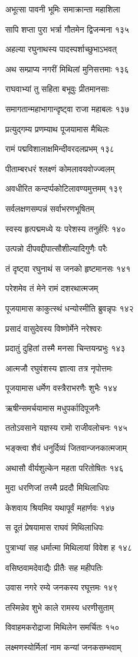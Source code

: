 अभूत्सा पावनी भूमिः समाक्रान्ता महाशिला

सापि शप्ता पुरा भर्त्रा गौतमेन द्विजन्मना १३५

अहल्या रघुनाथस्य पादस्पर्शाच्छुभाऽभवत्

अथ सम्प्राप्य नगरीं मिथिलां मुनिसत्तमाः १३६

राघवाभ्यां तु सहिता बभूवुः प्रीतमानसाः

समागतान्महाभागान्दृष्ट्वा राजा महाबलः १३७

प्रत्युद्गम्य प्रणम्याथ पूजयामास मैथिलः

रामं पद्मविशालाक्षमिन्दीवरदलप्रभम् १३८

पीताम्बरधरं श्लक्ष्णं कोमलावयवोज्ज्वलम्

अवधीरित कन्दर्प्पकोटिलावण्यमुत्तमम् १३९

सर्वलक्षणसम्पन्नं सर्वाभरणभूषितम्

स्वस्य हृत्पद्ममध्ये यः परेशस्य तनुर्हरिः १४०

उत्पन्नो दीपवद्दीपात्सौशील्यादिगुणैः परैः

तं दृष्ट्वा रघुनाथं स जनको हृष्टमानसः १४१

परेशमेव तं मेने रामं दशरथात्मजम्

पूजयामास काकुत्स्थं धन्योस्मीति ब्रुवन्नृपः १४२

प्रसादं वासुदेवस्य विष्णोर्मेने नरेश्वरः

प्रदातुं दुहितां तस्मै मनसा चिन्तयन्प्रभुः १४३

आत्मजौ रघुवंशस्य ज्ञात्वा तत्र नृपोत्तमः

पूजयामास धर्मेण वस्त्रैराभरणैः शुभैः १४४

ऋषीन्समर्चयामास मधुपर्कादिपूजनैः

ततोऽवसाने यज्ञस्य रामो राजीवलोचनः १४५

भङ्क्त्वा शैवं धनुर्दिव्यं जितवान्जनकात्मजाम्

अथासौ वीर्यशुल्केन महता परितोषितः १४६

मुदा धरणिजां तस्मै प्रददौ मिथिलाधिपः

केशवाय श्रियमिव यथापूर्वं महार्णवः १४७

स दूतं प्रेषयामास राघवं मिथिलाधिपः

पुत्राभ्यां सह धर्मात्मा मिथिलायां विवेश ह १४८

वसिष्ठवामदेवाद्यैः प्रीतैः सह महीपतिः

उवास नगरे रम्ये जनकस्य रघूत्तमः १४९

तस्मिन्नेव शुभे काले रामस्य धरणीसुताम्

विवाहमकरोद्राजा मिथिलेन समर्चितः १५०

लक्ष्मणस्योर्मिलां नाम कन्यां जनकसम्भवाम्

